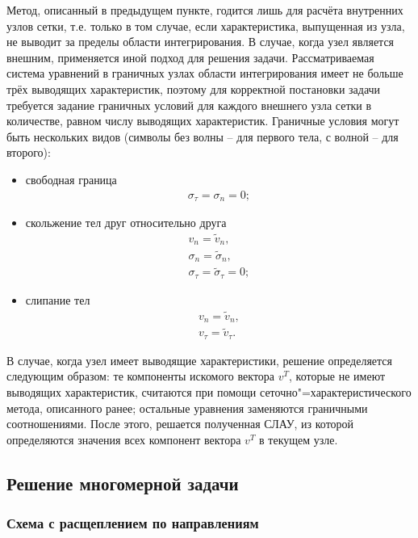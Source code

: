 Метод, описанный в предыдущем пункте, годится лишь для расчёта внутренних узлов
сетки, т.е. только в том случае, если характеристика, выпущенная из узла, не
выводит за пределы области интегрирования. В случае, когда узел является
внешним, применяется иной подход для решения задачи. Рассматриваемая система
уравнений в граничных узлах области интегрирования имеет не больше трёх
\cite{chelnokov} выводящих характеристик, поэтому для корректной постановки
задачи требуется задание граничных условий для каждого внешнего узла сетки в
количестве, равном числу выводящих характеристик. Граничные условия могут быть
нескольких видов (символы без волны -- для первого тела, с волной -- для второго):
\begin{itemize}
\item{свободная граница
\begin{eqnarray}
\sigma_\tau=\sigma_n=0; \nonumber
\end{eqnarray}}
\item{скольжение тел друг относительно друга 
\begin{eqnarray}
v_n=\tilde{v}_n,\nonumber\\
\sigma_n=\tilde{\sigma}_n,\nonumber\\
\sigma_\tau=\tilde{\sigma}_\tau=0; \nonumber
\end{eqnarray}}
\item{слипание тел
\begin{eqnarray}
v_n=\tilde{v}_n,\nonumber\\
v_\tau=\tilde{v}_\tau.
\end{eqnarray}}
\end{itemize}
В случае, когда узел имеет выводящие характеристики, решение определяется
следующим образом: те компоненты искомого вектора $v^T$, которые не имеют
выводящих характеристик, считаются при помощи сеточно"=характеристического
метода, описанного ранее; остальные уравнения заменяются граничными
соотношениями. После этого, решается полученная СЛАУ, из которой определяются
значения всех компонент вектора $v^T$ в текущем узле.


\subsection{Решение многомерной задачи}

\subsubsection{Схема с расщеплением по направлениям}

